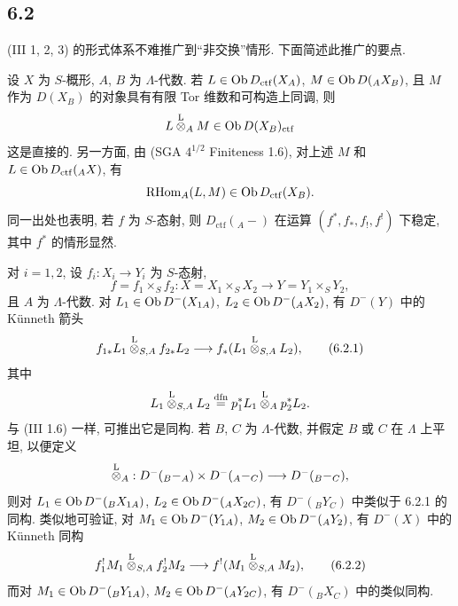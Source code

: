 \subsection*{6.2}
(III 1, 2, 3) 的形式体系不难推广到``非交换''情形. 下面简述此推广的要点.

设 $X$ 为 $S$-概形, $A$, $B$ 为 $\Lambda$-代数. 若 $L\in\operatorname{Ob} D_{\mathrm{ctf}}(X_A)$, $M\in\operatorname{Ob} D({}_AX_B)$, 且 $M$ 作为 $D(X_B)$ 的对象具有有限 Tor 维数和可构造上同调, 则
\[
L\overset{\mathrm L}{\otimes}_A M\in\operatorname{Ob} D(X_B)_{\mathrm{ctf}}
\]
这是直接的. 另一方面, 由 (SGA $4^{1/2}$ Finiteness 1.6), 对上述 $M$ 和 $L\in\operatorname{Ob} D_{\mathrm{ctf}}({}_AX)$, 有
\[
\mathrm{RHom}_A(L,M)\in\operatorname{Ob} D_{\mathrm{ctf}}(X_B).
\]
同一出处也表明, 若 $f$ 为 $S$-态射, 则 $D_{\mathrm{ctf}}({}_A-)$ 在运算 $(f^*,f_*,f_!,f^!)$ 下稳定, 其中 $f^*$ 的情形显然.

对 $i=1,2$, 设 $f_i:X_i\to Y_i$ 为 $S$-态射,
\[
f=f_1\times_S f_2:X=X_1\times_SX_2\longrightarrow Y=Y_1\times_SY_2,
\]
且 $A$ 为 $\Lambda$-代数. 对 $L_1\in\operatorname{Ob} D^-(X_{1A})$, $L_2\in\operatorname{Ob} D^-({}_AX_2)$, 有 $D^-(Y)$ 中的 Künneth 箭头
\begin{equation}
f_{1*}L_1\overset{\mathrm L}{\otimes}_{S,A}f_{2*}L_2
\longrightarrow
f_*(L_1\overset{\mathrm L}{\otimes}_{S,A}L_2),
\tag{6.2.1}
\end{equation}
其中
\[
L_1\overset{\mathrm L}{\otimes}_{S,A}L_2
\stackrel{\mathrm{dfn}}{=}p_1^*L_1\overset{\mathrm L}{\otimes}_Ap_2^*L_2.
\]
与 (III 1.6) 一样, 可推出它是同构. 若 $B$, $C$ 为 $\Lambda$-代数, 并假定 $B$ 或 $C$ 在 $\Lambda$ 上平坦, 以便定义
\[
\overset{\mathrm L}{\otimes}_A:D^-({}_B{-}_A)\times D^-({}_A{-}_C)\longrightarrow D^-({}_B{-}_C),
\]
则对 $L_1\in\operatorname{Ob} D^-({}_BX_{1A})$, $L_2\in\operatorname{Ob} D^-({}_AX_{2C})$, 有 $D^-({}_BY_C)$ 中类似于 6.2.1 的同构. 类似地可验证, 对 $M_1\in\operatorname{Ob} D^-(Y_{1A})$, $M_2\in\operatorname{Ob} D^-({}_AY_2)$, 有 $D^-(X)$ 中的 Künneth 同构
\begin{equation}
f_1^!M_1\overset{\mathrm L}{\otimes}_{S,A}f_2^!M_2
\longrightarrow
f^!(M_1\overset{\mathrm L}{\otimes}_{S,A}M_2),
\tag{6.2.2}
\end{equation}
而对 $M_1\in\operatorname{Ob} D^-({}_BY_{1A})$, $M_2\in\operatorname{Ob} D^-({}_AY_{2C})$, 有 $D^-({}_B X_C)$ 中的类似同构.

